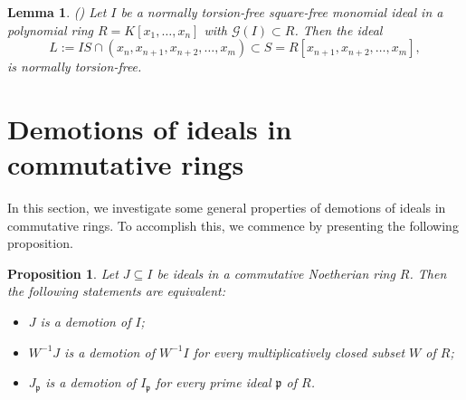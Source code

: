 \documentclass[11pt]{amsart}
\newtheorem{lemma}[theorem]{Lemma}
\newtheorem{proposition}[theorem]{Proposition}
\begin{document}
\begin{lemma} \label{NTF1} (\cite[Lemma 2.17]{NQBM})
Let $I$ be a normally torsion-free square-free  monomial ideal in a polynomial ring $R=K[x_{1},\ldots ,x_{n}]$ with $\mathcal{G}(I) \subset R$. Then the ideal $$L:=IS\cap (x_{n}, x_{n+1}, x_{n+2}, \ldots, x_m)\subset  S=R[x_{n+1}, x_{n+2}, \ldots, x_m],$$  is normally torsion-free.
\end{lemma}





\section{Demotions of ideals in commutative rings} \label{Section 3}

  In this section, we investigate some general properties of demotions of ideals in commutative rings. To accomplish this, we commence by presenting the following proposition.

\begin{proposition} \label{Pro.General.1}
Let $J \subseteq I$ be ideals  in a commutative Noetherian ring $R$. Then the following statements are equivalent:
\begin{itemize}
\item[(i)]  $J$ is  a demotion of $I$;
\item[(ii)]  $W^{-1}J$ is a demotion of $W^{-1}I$ for every multiplicatively closed subset $W$ of $R$; 
\item[(iii)] $J_{\mathfrak{p}}$ is a demotion of $I_{\mathfrak{p}}$ for every prime ideal $\mathfrak{p}$ of $R$. 

\end{itemize}
\end{proposition}
\end{document}
